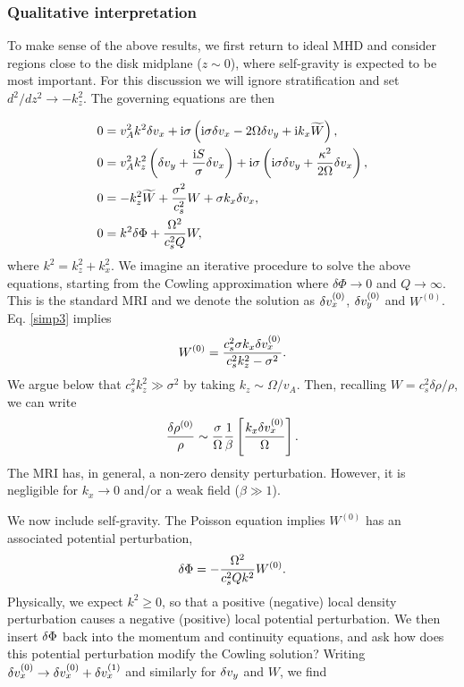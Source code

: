 \subsubsection{Qualitative interpretation} 
To make sense of the above results, we first return to ideal MHD and 
consider regions close to the disk midplane ($z\sim 0$), where
self-gravity is expected to be most important. For this discussion we
will ignore stratification and set $d^2/dz^2\to -k_z^2$. The governing
equations are then 

\begin{align}
  &  0= v_A^2k^2\delta v_x + \mathrm{i}\sigma\left(\mathrm{i}\sigma \delta v_x - 2\Omega\delta v_y + \mathrm{i} k_x \widetilde{W}\right),\label{simp1}\\
  &  0= v_A^2k_z^2\left(\delta v_y + \frac{\mathrm{i} S
  }{\sigma}\delta v_x\right) + \mathrm{i}\sigma\left(\mathrm{i}\sigma\delta v_y +
  \frac{\kappa^2}{2\Omega}\delta v_x\right),\label{simp2}\\
  & 0 = -k_z^2\widetilde{W} + \frac{\sigma^2}{c_s^2}W + \sigma k_x \delta v_x, \label{simp3}\\
  & 0 = k^2\delta \Phi + \frac{\Omega^2}{c_s^2Q}W,\label{simp4}
\end{align}
where $k^2 = k_z^2 + k_x^2$. We imagine an iterative procedure to
solve the above equations, starting from the Cowling approximation
where $\delta\Phi\to0$ and $Q\to\infty$. This is the standard MRI and we denote the
solution as $\delta v_x^{(0)}$, $\delta v_y^{(0)}$ and $W^{(0)}$. Eq. \ref{simp3} implies
\begin{align}
  W^{(0)} = \frac{c_s^2\sigma k_x \delta v_x^{(0)}}{c_s^2k_z^2 - \sigma^2}. 
\end{align}
We argue below that $c_s^2k_z^2\gg \sigma^2$ by taking $k_z\sim
\Omega/v_A$. Then, recalling $W=c_s^2\delta\rho/\rho$, we can write
\begin{align}
  \frac{\delta\rho^{(0)}}{\rho} \sim
  \frac{\sigma}{\Omega}\frac{1}{\beta}\left[\frac{k_x\delta v_x^{(0)}}{\Omega}\right].   
\end{align}
The MRI has, in general, a non-zero density perturbation. However, it
is negligible for $k_x\to 0$ and/or a weak field ($\beta \gg 1$). 


We now include self-gravity.  The Poisson equation implies $W^{(0)}$
has an associated potential perturbation,     
\begin{align} 
  \delta \Phi = -\frac{\Omega^2}{c_s^2 Q k^2} W^{(0)}.
\end{align}
Physically, we expect $k^2\geq0$, so that a positive (negative) local density
perturbation causes a negative (positive) local potential
perturbation. We then insert $\delta \Phi$ back into the momentum and
continuity equations, and ask how does this potential perturbation
modify the Cowling solution? Writing $\delta v_x^{(0)} \to \delta v_x^{(0)} +
\delta v_x^{(1)}$ and similarly for $\delta v_y $ and $ W$, we find 


